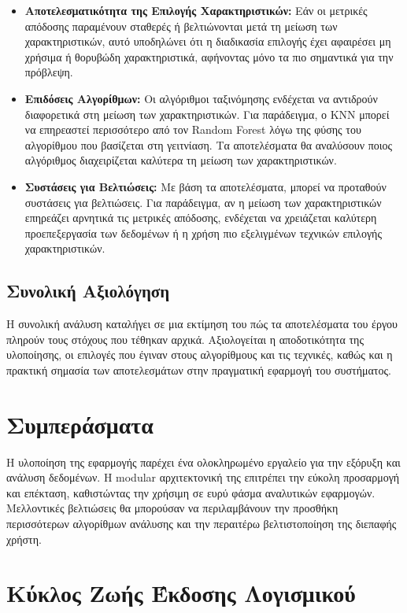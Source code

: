 \documentclass[a4paper,12pt]{article}
\begin{document}
\begin{itemize}
    \item \textbf{Αποτελεσματικότητα της Επιλογής Χαρακτηριστικών:}
    Εάν οι μετρικές απόδοσης παραμένουν σταθερές ή βελτιώνονται μετά τη μείωση των χαρακτηριστικών, αυτό υποδηλώνει ότι η διαδικασία επιλογής έχει αφαιρέσει μη χρήσιμα ή θορυβώδη χαρακτηριστικά, αφήνοντας μόνο τα πιο σημαντικά για την πρόβλεψη.
    
    \item \textbf{Επιδόσεις Αλγορίθμων:}
    Οι αλγόριθμοι ταξινόμησης ενδέχεται να αντιδρούν διαφορετικά στη μείωση των χαρακτηριστικών. Για παράδειγμα, ο KNN μπορεί να επηρεαστεί περισσότερο από τον Random Forest λόγω της φύσης του αλγορίθμου που βασίζεται στη γειτνίαση. Τα αποτελέσματα θα αναλύσουν ποιος αλγόριθμος διαχειρίζεται καλύτερα τη μείωση των χαρακτηριστικών.
    
    \item \textbf{Συστάσεις για Βελτιώσεις:}
    Με βάση τα αποτελέσματα, μπορεί να προταθούν συστάσεις για βελτιώσεις. Για παράδειγμα, αν η μείωση των χαρακτηριστικών επηρεάζει αρνητικά τις μετρικές απόδοσης, ενδέχεται να χρειάζεται καλύτερη προεπεξεργασία των δεδομένων ή η χρήση πιο εξελιγμένων τεχνικών επιλογής χαρακτηριστικών.
\end{itemize}

\subsection{Συνολική Αξιολόγηση}

Η συνολική ανάλυση καταλήγει σε μια εκτίμηση του πώς τα αποτελέσματα του έργου πληρούν τους στόχους που τέθηκαν αρχικά. Αξιολογείται η αποδοτικότητα της υλοποίησης, οι επιλογές που έγιναν στους αλγορίθμους και τις τεχνικές, καθώς και η πρακτική σημασία των αποτελεσμάτων στην πραγματική εφαρμογή του συστήματος.


\section{Συμπεράσματα}
Η υλοποίηση της εφαρμογής παρέχει ένα ολοκληρωμένο εργαλείο για την εξόρυξη και ανάλυση δεδομένων. Η modular αρχιτεκτονική της επιτρέπει την εύκολη προσαρμογή και επέκταση, καθιστώντας την χρήσιμη σε ευρύ φάσμα αναλυτικών εφαρμογών. Μελλοντικές βελτιώσεις θα μπορούσαν να περιλαμβάνουν την προσθήκη περισσότερων αλγορίθμων ανάλυσης και την περαιτέρω βελτιστοποίηση της διεπαφής χρήστη.

\section{Κύκλος Ζωής Έκδοσης Λογισμικού}
\end{document}
